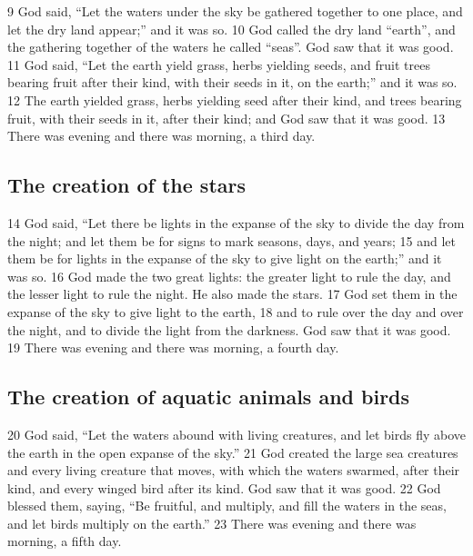 {9} God said, ``Let the waters under the sky be gathered together to one
place, and let the dry land appear;'' and it was so. {10} God called the
dry land ``earth'', and the gathering together of the waters he called
``seas''. God saw that it was good. {11} God said, ``Let the earth yield
grass, herbs yielding seeds, and fruit trees bearing fruit after their
kind, with their seeds in it, on the earth;'' and it was so. {12} The
earth yielded grass, herbs yielding seed after their kind, and trees
bearing fruit, with their seeds in it, after their kind; and God saw
that it was good. {13} There was evening and there was morning, a third
day.

\hypertarget{the-creation-of-the-stars}{%
\subsection{The creation of the stars}\label{the-creation-of-the-stars}}

{14} God said, ``Let there be lights in the expanse of the sky to divide
the day from the night; and let them be for signs to mark seasons, days,
and years; {15} and let them be for lights in the expanse of the sky to
give light on the earth;'' and it was so. {16} God made the two great
lights: the greater light to rule the day, and the lesser light to rule
the night. He also made the stars. {17} God set them in the expanse of
the sky to give light to the earth, {18} and to rule over the day and
over the night, and to divide the light from the darkness. God saw that
it was good. {19} There was evening and there was morning, a fourth day.

\hypertarget{the-creation-of-aquatic-animals-and-birds}{%
\subsection{The creation of aquatic animals and
birds}\label{the-creation-of-aquatic-animals-and-birds}}

{20} God said, ``Let the waters abound with living creatures, and let
birds fly above the earth in the open expanse of the sky.'' {21} God
created the large sea creatures and every living creature that moves,
with which the waters swarmed, after their kind, and every winged bird
after its kind. God saw that it was good. {22} God blessed them, saying,
``Be fruitful, and multiply, and fill the waters in the seas, and let
birds multiply on the earth.'' {23} There was evening and there was
morning, a fifth day.


